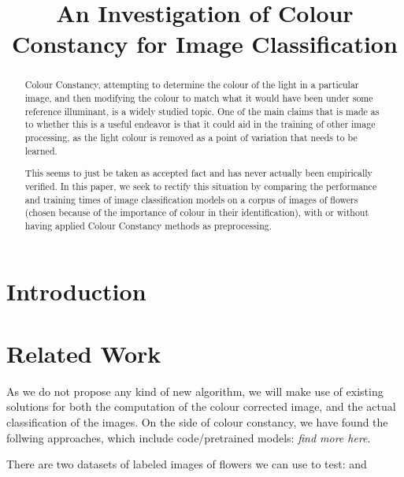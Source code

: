 \documentclass{bmvc2k}
\title{An Investigation of Colour Constancy for Image Classification}
\begin{document}
\maketitle

\begin{abstract}
Colour Constancy, attempting to determine the colour of the light in a particular image, and then 
modifying the colour to match what it would have been under some reference illuminant, is a widely studied topic.
One of the main claims that is made as to whether this is a useful endeavor is that it could aid in the training
of other image processing, as the light colour is removed as a point of variation that needs to be learned.

This seems to just be taken as accepted fact and has never actually been empirically verified. In this paper, we
seek to rectify this situation by comparing the performance and training times of image classification models on 
a corpus of images of flowers (chosen because of the importance of colour in their identification), with or without
having applied Colour Constancy methods as preprocessing.
\end{abstract}

\section{Introduction}

\section{Related Work}

As we do not propose any kind of new algorithm, we will make use of existing solutions for both
the computation of the colour corrected image, and the actual classification of the images.
On the side of colour constancy, we have found the follwing approaches, which include code/pretrained models:
\cite{hu2017fc} {\it find more here}.

There are two datasets of labeled images of flowers we can use to test: \cite{Nilsback06} and \cite{Nilsback08}


\end{document}
